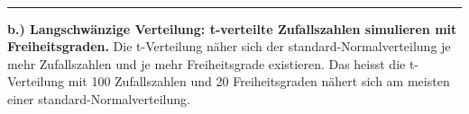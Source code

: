 \documentclass[11pt]{article}
\begin{document}
    \begin{center}
    \end{center}
    { \hspace*{\fill} \\}
    
    \begin{center}\rule{0.5\linewidth}{\linethickness}\end{center}

\textbf{b.) Langschwänzige Verteilung: t-verteilte Zufallszahlen
simulieren mit Freiheitsgraden.} Die t-Verteilung näher sich der
standard-Normalverteilung je mehr Zufallszahlen und je mehr
Freiheitsgrade existieren. Das heisst die t-Verteilung mit 100
Zufallszahlen und 20 Freiheitsgraden nähert sich am meisten einer
standard-Normalverteilung.
\end{document}
